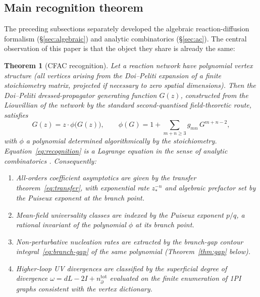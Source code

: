 \documentclass[11pt,a4paper]{article}
\theoremstyle{plain}
\newtheorem{theorem}{Theorem}
\begin{document}
\subsection{Main recognition theorem}
\label{sec:recognition}

The preceding subsections separately developed the algebraic
reaction-diffusion formalism (\S\ref{sec:algebraic}) and analytic
combinatorics (\S\ref{sec:ac}).  The central observation of this
paper is that the object they share is already the same:

\begin{theorem}[CFAC recognition]
\label{thm:recognition}
Let a reaction network have polynomial vertex structure (all
vertices arising from the Doi--Peliti expansion of a finite
stoichiometry matrix, projected if necessary to zero spatial
dimensions).  Then the Doi--Peliti dressed-propagator generating
function $G(z)$, constructed from the Liouvillian of the network
by the standard second-quantised field-theoretic route, satisfies
\begin{equation}\label{eq:recognition}
  G(z) = z\cdot\phi\bigl(G(z)\bigr),
  \qquad
  \phi(G) = 1 + \sum_{m + n \geq 3} g_{m n}\,G^{m + n - 2},
\end{equation}
with $\phi$ a polynomial determined algorithmically by the
stoichiometry.  Equation~\eqref{eq:recognition} is a Lagrange
equation in the sense of analytic combinatorics
\citep{FlajoletSedgewick}.  Consequently:
\begin{enumerate}[leftmargin=1.8em, itemsep=-0.2em]
\item \textit{All-orders coefficient asymptotics} are given by the
  transfer theorem~\eqref{eq:transfer}, with exponential rate
  $z_*^{-n}$ and algebraic prefactor set by the Puiseux exponent
  at the branch point.
\item \textit{Mean-field universality classes} are indexed by the
  Puiseux exponent $p/q$, a rational invariant of the polynomial
  $\phi$ at its branch point.
\item \textit{Non-perturbative nucleation rates} are extracted by
  the branch-gap contour
  integral~\eqref{eq:branch-gap} of the same polynomial
  (Theorem~\ref{thm:gap} below).
\item \textit{Higher-loop UV divergences} are classified by the
  superficial degree of divergence
  $\omega = dL - 2I + n_\partial^{\mathrm{tot}}$ evaluated on the
  finite enumeration of 1PI graphs consistent with the vertex
  dictionary.
\end{enumerate}
\end{theorem}
\end{document}
